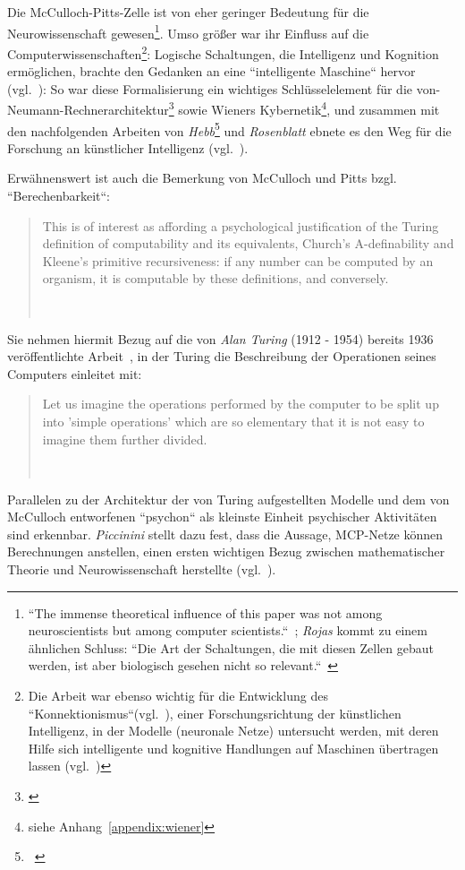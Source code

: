 Die McCulloch-Pitts-Zelle ist von eher geringer Bedeutung für die Neurowissenschaft gewesen\footnote{
    ``The immense theoretical influence of this paper was not among neuroscientists but among computer scientists.``~\cite[17]{AR88}; \textit{Rojas} kommt zu einem ähnlichen Schluss: ``Die Art der Schaltungen, die mit diesen Zellen gebaut werden, ist aber biologisch gesehen nicht so relevant.``~\cite[51]{Roj93}
}.
Umso größer war ihr Einfluss auf die Computerwissenschaften\footnote{
    Die Arbeit war ebenso wichtig für die Entwicklung des ``Konnektionismus``(vgl.~\cite[11]{Arb19}), einer Forschungsrichtung der künstlichen Intelligenz, in der Modelle (neuronale Netze) untersucht werden, mit deren Hilfe sich intelligente und kognitive Handlungen auf Maschinen übertragen lassen (vgl.~\cite[v]{Dor91})
}: Logische Schaltungen, die Intelligenz und Kognition ermöglichen, brachte den Gedanken an eine ``intelligente Maschine`` hervor (vgl.~\cite[204]{Pic04}): So war diese Formalisierung ein wichtiges Schlüsselelement für die von-Neumann-Rechnerarchitektur\footnote{\cite{Neu93}} sowie Wieners Kybernetik\footnote{siehe Anhang~\ref{appendix:wiener}}, und zusammen mit den nachfolgenden Arbeiten von \textit{Hebb}\footnote{~\cite{Heb49}} und \textit{Rosenblatt} ebnete es den Weg für die Forschung an künstlicher Intelligenz (vgl.~\cite[1]{Arb19}).


Erwähnenswert ist auch die Bemerkung von McCulloch und Pitts bzgl. ``Berechenbarkeit``:

\blockquote[{~\cite[113]{MP43}}]{
    This is of interest as affording a psychological justification of the Turing definition of computability and its equivalents, Church’s A-definability and Kleene’s primitive recursiveness: if any number can be computed by an organism, it is computable by these definitions, and conversely.
}


Sie nehmen hiermit Bezug auf die von \textit{Alan Turing} (1912 - 1954) bereits 1936 veröffentlichte Arbeit~\cite{Tur37}, in der Turing die Beschreibung der Operationen seines Computers einleitet mit:

\blockquote[{~\cite[250]{Tur37}}]{
    Let us imagine the operations performed by the computer to be split up into 'simple operations' which are so elementary that it is not easy to imagine them further divided.
}


Parallelen zu der Architektur der von Turing aufgestellten Modelle und dem von McCulloch entworfenen ``psychon`` als kleinste Einheit psychischer Aktivitäten sind erkennbar. \textit{Piccinini} stellt dazu fest, dass die Aussage, MCP-Netze können Berechnungen anstellen, einen ersten wichtigen Bezug zwischen mathematischer Theorie und Neurowissenschaft herstellte (vgl.~\cite[197]{Pic04}).\\


